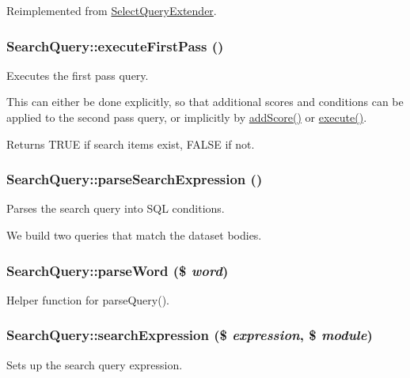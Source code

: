 Reimplemented from \hyperlink{classSelectQueryExtender}{SelectQueryExtender}.\hypertarget{classSearchQuery_a26f4f25d5720b6858c06fed4785914d7}{
\subsubsection[{executeFirstPass}]{\setlength{\rightskip}{0pt plus 5cm}SearchQuery::executeFirstPass ()}}
\label{classSearchQuery_a26f4f25d5720b6858c06fed4785914d7}
Executes the first pass query.

This can either be done explicitly, so that additional scores and conditions can be applied to the second pass query, or implicitly by \hyperlink{classSearchQuery_a72dc185ab8034f0979d877b6b9c57b1c}{addScore()} or \hyperlink{classSearchQuery_acedd13d6590d0013488873ec33fc6482}{execute()}.

\begin{DoxyReturn}{Returns}
TRUE if search items exist, FALSE if not. 
\end{DoxyReturn}
\hypertarget{classSearchQuery_adbb7c8e1b7f6ff56b168cce84b4b38d0}{
\subsubsection[{parseSearchExpression}]{\setlength{\rightskip}{0pt plus 5cm}SearchQuery::parseSearchExpression ()}}
\label{classSearchQuery_adbb7c8e1b7f6ff56b168cce84b4b38d0}
Parses the search query into SQL conditions.

We build two queries that match the dataset bodies. \hypertarget{classSearchQuery_a5a2743ed22476b614f9feed7d7bb7df9}{
\subsubsection[{parseWord}]{\setlength{\rightskip}{0pt plus 5cm}SearchQuery::parseWord (\$ {\em word})}}
\label{classSearchQuery_a5a2743ed22476b614f9feed7d7bb7df9}
Helper function for parseQuery(). \hypertarget{classSearchQuery_a29e645e6deda9aa994b9b6e24384e21a}{
\subsubsection[{searchExpression}]{\setlength{\rightskip}{0pt plus 5cm}SearchQuery::searchExpression (\$ {\em expression}, \/  \$ {\em module})}}
\label{classSearchQuery_a29e645e6deda9aa994b9b6e24384e21a}
Sets up the search query expression.


